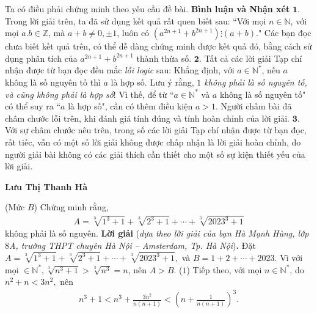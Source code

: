 \begin{multicols}{2}
	\vskip 0.05cm
	Ta có điều phải chứng minh theo yêu cầu đề bài.
	\vskip 0.05cm
	\textbf{\color{thachthuctoanhoc}Bình luận và Nhận xét}
	\vskip 0.05cm
	$\pmb{1.}$ Trong lời giải trên, ta đã sử dụng kết quả rất quen biết sau:
	\vskip 0.05cm
	``Với mọi $n \in \mathbb{N}$, với mọi  $a.b \in \mathbb{Z}$, mà $a + b \ne  0, \pm 1$, luôn có  $\left( {{a^{2n + 1}} + {b^{2n + 1}}} \right) \vdots \left( {a + b} \right).$"
	\vskip 0.05cm
	Các bạn đọc chưa biết kết quả trên, có thể dễ dàng chứng minh được kết quả đó, bằng cách sử dụng phân tích của ${a^{2n + 1}} + {b^{2n + 1}}$ thành thừa số.
	\vskip 0.05cm
	$\pmb{2.}$ Tất cả các lời giải Tạp chí nhận được từ bạn đọc đều mắc \textit{lỗi logic} sau: Khẳng định, với $a \in \mathbb{N^*}$, nếu $a$ không là số nguyên tố thì $a$ là hợp số.
	\vskip 0.05cm
	Lưu ý rằng, \textit{$1$ không phải là số nguyên tố, và cũng không phải là hợp số}! Vì thế, để từ ``$a \in \mathbb{N^*}$  và $a$ không là số nguyên tố" có thể suy ra ``$a$ là hợp số", cần có thêm điều kiện $a > 1$.
	\vskip 0.05cm
	Người chấm bài đã châm chước lỗi trên, khi đánh giá tính đúng và tính hoàn chỉnh của lời giải.
	\vskip 0.05cm
	$\pmb{3.}$ Với sự châm chước nêu trên, trong số các lời giải Tạp chí nhận được từ bạn đọc, rất tiếc, vẫn có một số lời giải không được chấp nhận là lời giải hoàn chỉnh, do người giải bài không có các giải thích cần thiết cho một số sự kiện thiết yếu của lời giải.
	\begin{flushright}
		\textbf{\color{thachthuctoanhoc}Lưu Thị Thanh Hà}
	\end{flushright}
	{}
	(Mức $B$) Chứng minh rằng,
	\begin{align*}
		A\!=\!\sqrt[3]{1^3\!+\!1}\!+\!\sqrt[3]{2^3\!+\!1}\!+\!\cdots\!+\!\sqrt[3]{2023^3\!+\!1}
	\end{align*}
	không phải là số nguyên.
	\vskip 0.05cm
	\textbf{\color{thachthuctoanhoc}Lời giải} (\textit{dựa theo lời giải của bạn Hà Mạnh Hùng, lớp $8$A, trường THPT chuyên Hà Nội -- Amsterdam, Tp. Hà Nội})\textbf{\color{thachthuctoanhoc}.}
	\vskip 0.05cm
	Đặt $A = \sqrt[3]{{{1^3} + 1}} + \sqrt[3]{{{2^3} + 1}} +  \cdots  + \sqrt[3]{{{{2023}^3} + 1}},$  và $B = 1 + 2 +  \cdots  + 2023$.
	\vskip 0.05cm 
	Vì với mọi  $ \in \mathbb{N^*}, \sqrt[3]{{{n^3} + 1}} > \sqrt[3]{{{n^3}}} = n$, nên $A > B$. \hfill ($1$)
	\vskip 0.05cm      
	Tiếp theo, với mọi $n \in \mathbb{N^*}$, do ${n^2} + n < 3{n^2},$  nên
	\begin{align*}
		{n^3} \!+\! 1 \!<\! {n^3} \!+\! \frac{{3{n^2}}}{{n\left( {n \!+\! 1} \right)}} \!<\! {\left( {n \!+\! \frac{1}{{n\left( {n \!+\! 1} \right)}}} \right)^3}\!.

\end{align*}
\end{multicols}

